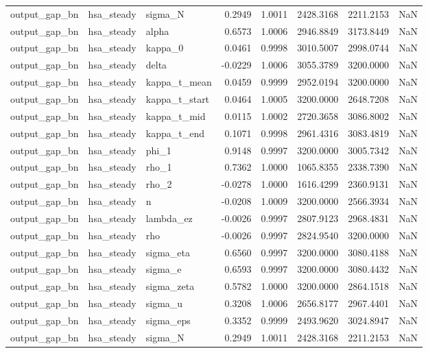 \begin{tabular}{lllrrrrl}
output\_gap\_bn & hsa\_steady & sigma\_N & 0.2949 & 1.0011 & 2428.3168 & 2211.2153 & NaN \\
output\_gap\_bn & hsa\_steady & alpha & 0.6573 & 1.0006 & 2946.8849 & 3173.8449 & NaN \\
output\_gap\_bn & hsa\_steady & kappa\_0 & 0.0461 & 0.9998 & 3010.5007 & 2998.0744 & NaN \\
output\_gap\_bn & hsa\_steady & delta & -0.0229 & 1.0006 & 3055.3789 & 3200.0000 & NaN \\
output\_gap\_bn & hsa\_steady & kappa\_t\_mean & 0.0459 & 0.9999 & 2952.0194 & 3200.0000 & NaN \\
output\_gap\_bn & hsa\_steady & kappa\_t\_start & 0.0464 & 1.0005 & 3200.0000 & 2648.7208 & NaN \\
output\_gap\_bn & hsa\_steady & kappa\_t\_mid & 0.0115 & 1.0002 & 2720.3658 & 3086.8002 & NaN \\
output\_gap\_bn & hsa\_steady & kappa\_t\_end & 0.1071 & 0.9998 & 2961.4316 & 3083.4819 & NaN \\
output\_gap\_bn & hsa\_steady & phi\_1 & 0.9148 & 0.9997 & 3200.0000 & 3005.7342 & NaN \\
output\_gap\_bn & hsa\_steady & rho\_1 & 0.7362 & 1.0000 & 1065.8355 & 2338.7390 & NaN \\
output\_gap\_bn & hsa\_steady & rho\_2 & -0.0278 & 1.0000 & 1616.4299 & 2360.9131 & NaN \\
output\_gap\_bn & hsa\_steady & n & -0.0208 & 1.0009 & 3200.0000 & 2566.3934 & NaN \\
output\_gap\_bn & hsa\_steady & lambda\_ez & -0.0026 & 0.9997 & 2807.9123 & 2968.4831 & NaN \\
output\_gap\_bn & hsa\_steady & rho & -0.0026 & 0.9997 & 2824.9540 & 3200.0000 & NaN \\
output\_gap\_bn & hsa\_steady & sigma\_eta & 0.6560 & 0.9997 & 3200.0000 & 3080.4188 & NaN \\
output\_gap\_bn & hsa\_steady & sigma\_e & 0.6593 & 0.9997 & 3200.0000 & 3080.4432 & NaN \\
output\_gap\_bn & hsa\_steady & sigma\_zeta & 0.5782 & 1.0000 & 3200.0000 & 2864.1518 & NaN \\
output\_gap\_bn & hsa\_steady & sigma\_u & 0.3208 & 1.0006 & 2656.8177 & 2967.4401 & NaN \\
output\_gap\_bn & hsa\_steady & sigma\_eps & 0.3352 & 0.9999 & 2493.9620 & 3024.8947 & NaN \\
output\_gap\_bn & hsa\_steady & sigma\_N & 0.2949 & 1.0011 & 2428.3168 & 2211.2153 & NaN \\

\end{tabular}
